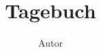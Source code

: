 \documentclass[a5paper, 12pt, twoside]{book}
\title{Tagebuch}
\author{Autor}
\begin{document}
\maketitle

\blindtext
\end{document}
